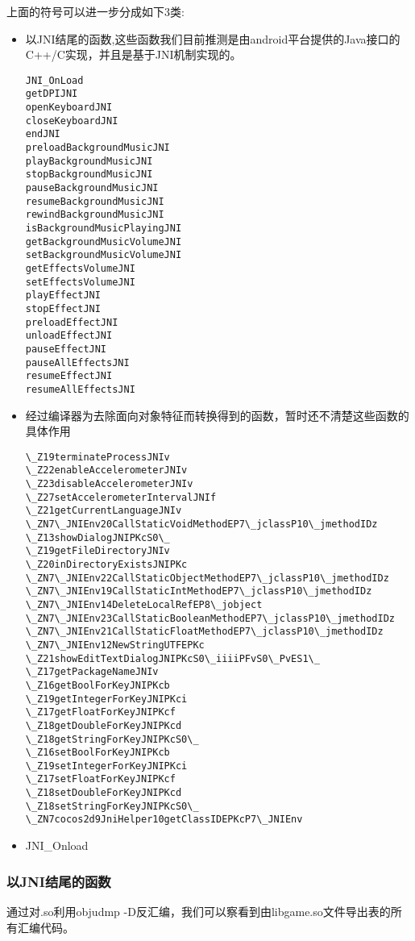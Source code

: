 上面的符号可以进一步分成如下3类:
\begin{itemize}
\item 以JNI结尾的函数,这些函数我们目前推测是由android平台提供的Java接口的C++/C实现，并且是基于JNI机制实现的。
\begin{lstlisting}
JNI_OnLoad
getDPIJNI
openKeyboardJNI
closeKeyboardJNI
endJNI
preloadBackgroundMusicJNI
playBackgroundMusicJNI
stopBackgroundMusicJNI
pauseBackgroundMusicJNI
resumeBackgroundMusicJNI
rewindBackgroundMusicJNI
isBackgroundMusicPlayingJNI
getBackgroundMusicVolumeJNI
setBackgroundMusicVolumeJNI
getEffectsVolumeJNI
setEffectsVolumeJNI
playEffectJNI
stopEffectJNI
preloadEffectJNI
unloadEffectJNI
pauseEffectJNI
pauseAllEffectsJNI
resumeEffectJNI
resumeAllEffectsJNI
\end{lstlisting}
\item 经过编译器为去除面向对象特征而转换得到的函数，暂时还不清楚这些函数的具体作用
\begin{lstlisting}
\_Z19terminateProcessJNIv
\_Z22enableAccelerometerJNIv
\_Z23disableAccelerometerJNIv
\_Z27setAccelerometerIntervalJNIf
\_Z21getCurrentLanguageJNIv
\_ZN7\_JNIEnv20CallStaticVoidMethodEP7\_jclassP10\_jmethodIDz
\_Z13showDialogJNIPKcS0\_
\_Z19getFileDirectoryJNIv
\_Z20inDirectoryExistsJNIPKc
\_ZN7\_JNIEnv22CallStaticObjectMethodEP7\_jclassP10\_jmethodIDz
\_ZN7\_JNIEnv19CallStaticIntMethodEP7\_jclassP10\_jmethodIDz
\_ZN7\_JNIEnv14DeleteLocalRefEP8\_jobject
\_ZN7\_JNIEnv23CallStaticBooleanMethodEP7\_jclassP10\_jmethodIDz
\_ZN7\_JNIEnv21CallStaticFloatMethodEP7\_jclassP10\_jmethodIDz
\_ZN7\_JNIEnv12NewStringUTFEPKc
\_Z21showEditTextDialogJNIPKcS0\_iiiiPFvS0\_PvES1\_
\_Z17getPackageNameJNIv
\_Z16getBoolForKeyJNIPKcb
\_Z19getIntegerForKeyJNIPKci
\_Z17getFloatForKeyJNIPKcf
\_Z18getDoubleForKeyJNIPKcd
\_Z18getStringForKeyJNIPKcS0\_
\_Z16setBoolForKeyJNIPKcb
\_Z19setIntegerForKeyJNIPKci
\_Z17setFloatForKeyJNIPKcf
\_Z18setDoubleForKeyJNIPKcd
\_Z18setStringForKeyJNIPKcS0\_
\_ZN7cocos2d9JniHelper10getClassIDEPKcP7\_JNIEnv
\end{lstlisting}
\item JNI\_Onload
\end{itemize}

\subsubsection{以JNI结尾的函数}
通过对.so利用objudmp -D反汇编，我们可以察看到由libgame.so文件导出表的所有汇编代码。

